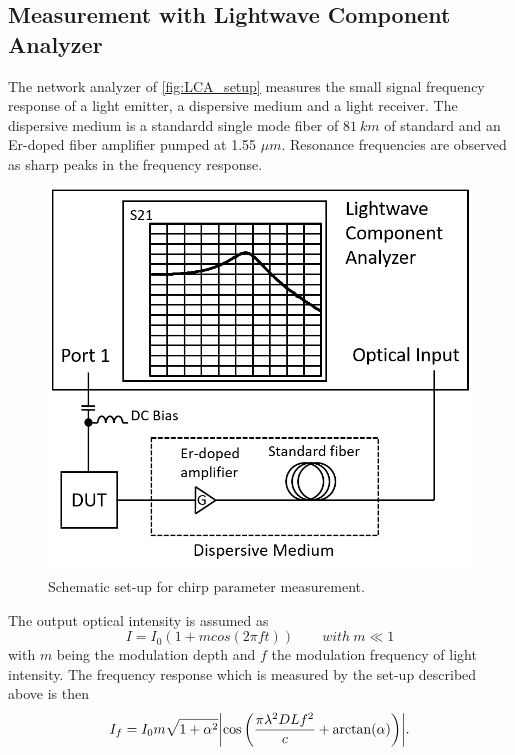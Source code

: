 
\subsection{Measurement with Lightwave Component Analyzer}\label{subsec:measurement_with_LCA}
The network analyzer of \autoref{fig:LCA_setup} measures the small signal frequency response of a light emitter, a dispersive medium and a light receiver. The dispersive medium is a standardd single mode fiber of $81 \ km$ of standard and an Er-doped fiber amplifier pumped at 1.55 $\mu m$. Resonance frequencies are observed as sharp peaks in the frequency response.
\begin{figure}[ht]
    \centering
    \includegraphics[width=.5\linewidth]{figures/LCA_setup.png}
    \caption{Schematic set-up for chirp parameter measurement.}
    \label{fig:LCA_setup}
\end{figure}

The output optical intensity is assumed as \cite{devaux1993simple}
\begin{equation}
    I=I_0(1+mcos(2\pi ft)) \qquad with \ m \ll 1
    \label{eq:chirp_optical_intensity}
\end{equation}
with $m$ being the modulation depth and $f$ the modulation frequency of light intensity. The frequency response which is measured by the set-up described above is then \cite{devaux1993simple}
\begin{equation}
    I_f=I_0m\sqrt{1+\alpha^2}\abs{\cos\qty(\frac{\pi\lambda^2DLf^2}{c}+\arctan(\alpha))}.
    \label{eq:chirp_optical_frequency}
\end{equation}

